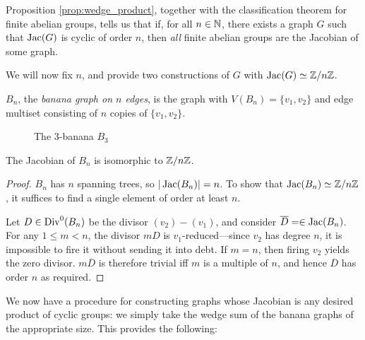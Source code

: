 \documentclass{amsart}
\begin{document}
Proposition \ref{prop:wedge_product}, together with the classification
theorem for finite abelian groups, tells us that if, for all $n \in
\mathbb{N}$, there exists a graph $G$ such that $\operatorname{Jac}(G)$ is cyclic of order
$n$, then \emph{all} finite abelian groups are the Jacobian of some
graph.

We will now fix $n$, and provide two constructions of $G$ with
$\operatorname{Jac}(G) \simeq \mathbb{Z}/n\mathbb{Z}$.

\begin{defn}
  $B_n$, the \emph{banana graph on $n$ edges}, is the graph with
  $V(B_n) = \{v_1, v_2\}$ and edge multiset consisting of $n$ copies of
  $\{v_1, v_2\}$.
\end{defn}

\begin{figure}[h]
  \begin{center}
    \caption{The $3$-banana $B_3$}
  \end{center}
\end{figure}

\begin{prop}
  \label{prop:banana_cyclic}
  The Jacobian of $B_n$ is isomorphic to $\mathbb{Z}/n\mathbb{Z}$.
\end{prop}

\begin{proof}
  $B_n$ has $n$ spanning trees, so
  $|\operatorname{Jac}(B_n)| = n$. To show that $\operatorname{Jac}(B_n) \simeq \mathbb{Z}/n\mathbb{Z}$, it
  suffices to find a single element of order at least $n$.

  Let $D \in \operatorname{Div}^0(B_n)$ be the divisor $(v_2) - (v_1)$, and consider
  $\overline{D} = \in \operatorname{Jac}(B_n)$. For any $1 \le m < n$, the divisor
  $mD$ is $v_1$-reduced---since $v_2$ has degree $n$, it is impossible
  to fire it without sending it into debt. If $m=n$, then firing $v_2$
  yields the zero divisor. $m\overline{D}$ is therefore trivial iff
  $m$ is a multiple of $n$, and hence $\overline{D}$ has order $n$ as
  required.
\end{proof}

We now have a procedure for constructing graphs whose Jacobian is any
desired product of cyclic groups: we simply take the wedge sum of the
banana graphs of the appropriate size. This provides the following:
\end{document}
